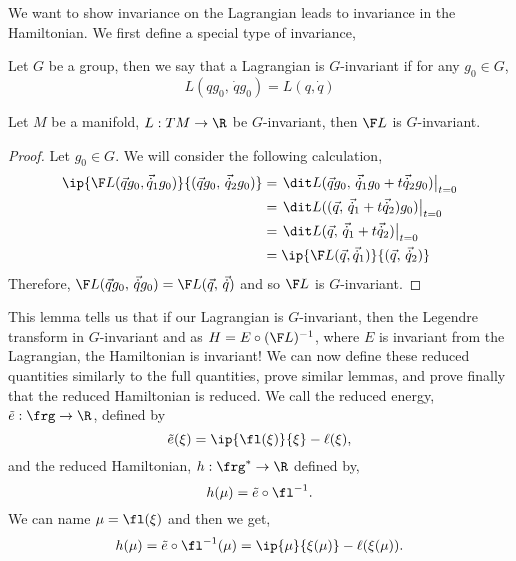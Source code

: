 \noindent
We want to show invariance on the Lagrangian leads to invariance in the Hamiltonian. We first define a special type of invariance,
\begin{ndefi}[G-invariance]
  Let $G$ be a group, then we say that a Lagrangian is $G$-invariant if for any $g_0 \in G$,
  $$ L(qg_0,\, \dot qg_0) = L(q, \dot q)$$
\end{ndefi}

\begin{nlemma}
  Let $M$ be a manifold, $L :TM \to \R$ be $G$-invariant, then $\F L$ is $G$-invariant.
\end{nlemma}
\begin{proof}
  Let $g_0 \in G$. We will consider the following calculation,
  \begin{align*}
    \ip{\F L(\vec qg_0, \vec{\dot q}_1g_0)}{(\vec qg_0,\, \vec{\dot q}_2g_0)} &= \left.\dit L(\vec qg_0,\, \vec {\dot q}_1g_0 + t\vec {\dot q}_2g_0 )\right|_{t = 0} \\
    &= \left.\dit L((\vec q,\, \vec {\dot q}_1  + t\vec {\dot q}_2 )g_0)\right|_{t=0} \\
    &= \left.\dit L(\vec q,\, \vec {\dot q}_1  + t\vec {\dot q}_2 )\right|_{t=0} \\
    &= \ip{\F L(\vec q, \vec {\dot q}_1)}{(\vec q,\, \vec {\dot q}_2)}
  \end{align*}
  Therefore, $\F L(\vec qg_0,\, \vec{\dot q}g_0) = \F L(\vec q,\, \vec{\dot q})$ and so $\F L$ is $G$-invariant.
\end{proof}

\noindent
This lemma tells us that if our Lagrangian is $G$-invariant, then the Legendre transform in $G$-invariant and as $H = E \circ (\F L)^{-1}$, where $E$ is invariant from the Lagrangian, the Hamiltonian is invariant! We can now define these reduced quantities similarly to the full quantities, prove similar lemmas, and prove finally that the reduced Hamiltonian is reduced. We call the reduced energy, $\tilde e : \frg \to \R$, defined by
$$ \tilde e(\xi) = \ip{\fl(\xi)}{\xi} - \ell(\xi), $$
and the reduced Hamiltonian, $h : \frg^* \to \R$ defined by,
$$ h(\mu) = \tilde e \circ \fl^{-1}. $$
We can name $\mu = \fl(\xi)$ and then we get,
$$ h(\mu) = \tilde e \circ \fl^{-1}(\mu) = \ip{\mu}{\xi(\mu)} - \ell(\xi(\mu)). $$


